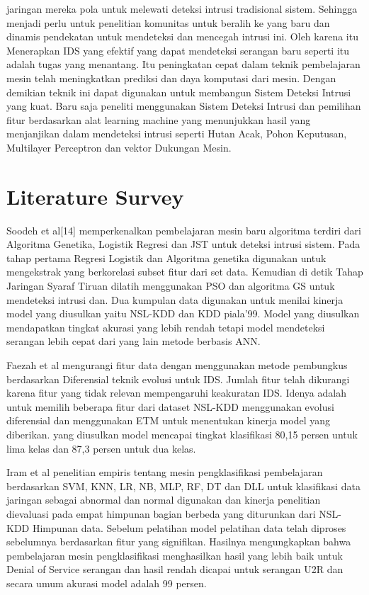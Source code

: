 \documentclass[conference]{IEEEtran}
\begin{document}
jaringan mereka pola untuk melewati deteksi intrusi tradisional sistem. Sehingga menjadi perlu untuk penelitian komunitas untuk beralih ke yang baru dan dinamis pendekatan untuk mendeteksi dan mencegah intrusi ini. Oleh karena itu Menerapkan IDS yang efektif yang dapat mendeteksi serangan baru seperti itu adalah tugas yang menantang. Itu peningkatan cepat dalam teknik pembelajaran mesin telah meningkatkan prediksi dan daya komputasi dari mesin. Dengan demikian teknik ini dapat digunakan untuk membangun Sistem Deteksi Intrusi yang kuat. Baru saja peneliti menggunakan Sistem Deteksi Intrusi dan pemilihan fitur berdasarkan alat learning machine yang menunjukkan hasil yang menjanjikan dalam mendeteksi intrusi seperti Hutan Acak\cite{ambikavathi2020predictor}, Pohon Keputusan\cite{sarker2020intrudtree}, Multilayer Perceptron\cite{moukhafi2020intelligent} dan vektor Dukungan Mesin\cite{safaldin2021improved}.
\section{Literature Survey}
Soodeh et al[14]\cite{hosseini2020new} memperkenalkan pembelajaran mesin baru algoritma terdiri dari Algoritma Genetika, Logistik Regresi dan JST untuk deteksi intrusi sistem. Pada tahap pertama Regresi Logistik dan Algoritma genetika digunakan untuk mengekstrak yang berkorelasi subset fitur dari set data. Kemudian di detik Tahap Jaringan Syaraf Tiruan dilatih menggunakan PSO dan algoritma GS untuk mendeteksi intrusi dan. Dua kumpulan data digunakan untuk menilai kinerja model yang diusulkan yaitu NSL-KDD dan KDD piala'99. Model yang diusulkan mendapatkan tingkat akurasi yang lebih rendah tetapi model mendeteksi serangan lebih cepat dari yang lain metode berbasis ANN. 

Faezah et al\cite{almasoudya2020differential} mengurangi fitur data dengan menggunakan metode pembungkus berdasarkan Diferensial teknik evolusi untuk IDS. Jumlah fitur telah dikurangi karena fitur yang tidak relevan mempengaruhi keakuratan IDS. Idenya adalah untuk memilih beberapa fitur dari dataset NSL-KDD menggunakan evolusi diferensial dan menggunakan ETM untuk menentukan kinerja model yang diberikan. yang diusulkan model mencapai tingkat klasifikasi 80,15 persen untuk lima kelas dan 87,3 persen  untuk dua kelas. 

Iram et al\cite{abrar2020machine} penelitian empiris tentang mesin pengklasifikasi pembelajaran berdasarkan SVM, KNN, LR, NB, MLP, RF, DT dan DLL untuk klasifikasi data jaringan sebagai abnormal dan normal digunakan dan kinerja penelitian dievaluasi pada empat himpunan bagian berbeda yang diturunkan dari NSL-KDD Himpunan data. Sebelum pelatihan model pelatihan data telah diproses sebelumnya berdasarkan fitur yang signifikan. Hasilnya mengungkapkan bahwa pembelajaran mesin pengklasifikasi menghasilkan hasil yang lebih baik untuk Denial of Service serangan dan hasil rendah dicapai untuk serangan U2R dan secara umum akurasi model adalah 99 persen. 
\end{document}

